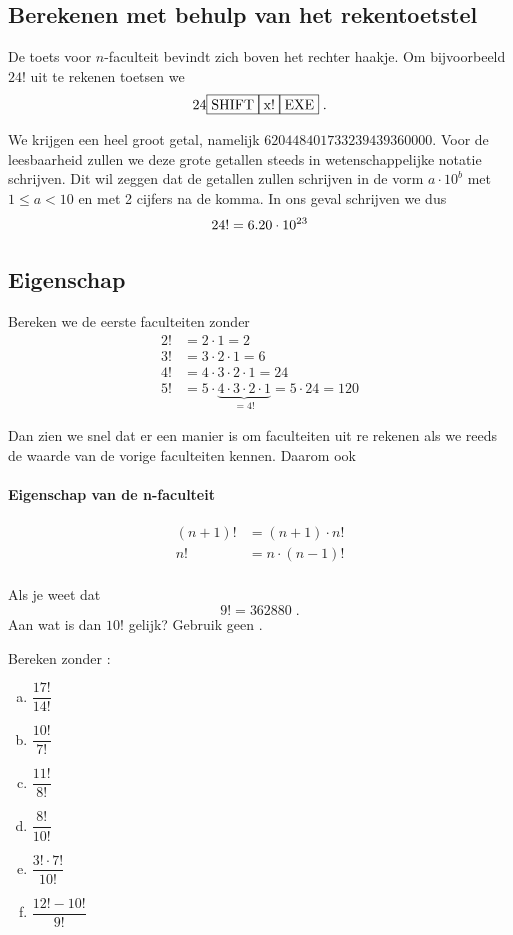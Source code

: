 \documentclass[12pt,a4paper,twoside]{article}
\begin{document}
\subsection{Berekenen met behulp van het rekentoetstel}

De toets voor $n$-faculteit bevindt zich boven het rechter haakje. Om bijvoorbeeld $24!$ uit te rekenen toetsen we
$$24 \zrm{SHIFT} \zrm{x!} \zrm{EXE}\;.$$

We krijgen een heel groot getal, namelijk $620448401733239439360000$. Voor de leesbaarheid zullen we deze grote getallen steeds in wetenschappelijke notatie schrijven. Dit wil zeggen dat de getallen zullen schrijven in de vorm $a \cdot 10^b$ met $1 \leq a < 10$ en met 2 cijfers na de komma. In ons geval schrijven we dus
\[24! = 6.20\cdot 10^{23}\]

\subsection{Eigenschap}

Bereken we de eerste faculteiten zonder 
\begin{align*}
  2! &= 2 \cdot 1 = 2\\
  3! &= 3 \cdot 2 \cdot 1 = 6\\
  4! &= 4 \cdot 3 \cdot 2 \cdot 1 = 24\\
  5! &= 5 \cdot \underbrace{4 \cdot 3 \cdot 2 \cdot 1}_{=4!} = 5 \cdot 24 = 120
\end{align*}

Dan zien we snel dat er een manier is om faculteiten uit re rekenen als we reeds de waarde van de vorige faculteiten kennen. Daarom ook
\paragraph*{Eigenschap van de n-faculteit}
\begin{mdframed}
\begin{align*}
  (n+1)! &= (n+1) \cdot n!\\
  n!     &= n \cdot (n-1)!\\
\end{align*}
\end{mdframed}

\begin{oefening}
Als je weet dat
$$9!=362880\;.$$
Aan wat is dan $10!$ gelijk? Gebruik geen .
\end{oefening}

\begin{oefening}
Bereken zonder :
\begin{multicols}{3}
\begin{enumerate}[(a)]
  \itemsep.7em
  \item $\dfrac{17!}{14!}$
  \item $\dfrac{10!}{7!}$
  \item $\dfrac{11!}{8!}$
  \item $\dfrac{8!}{10!}$
  \item $\dfrac{3!\cdot 7!}{10!}$
  \item $\dfrac{12!-10!}{9!}$
\end{enumerate}
\end{multicols}
\end{oefening}
\end{document}
